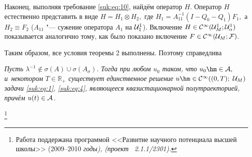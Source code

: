 \smallskip

Наконец,  выполняя  требование   \eqref{suk:eq:10},  найдём оператор $H.$ 
Оператор $H$ естественно представить в виде $H = H_1 \otimes H_2,$ где $H_1 =A^{-1}_{11}(I-Q_0-Q_1)F_1,$ а 
$H_2 \equiv F_2$ ($A_{11}$  "---  сужение оператора $A_1$ на ${\cal U}^1_1$). 
Включение \mbox{$H \in {\cal C}^{\infty}({\cal U}_M^1;{\cal U}_{\alpha}^1) $} показывается аналогично тому, как было показано включение $F \in {\cal C}^{\infty}({\cal U}_M;{\cal F})$.

Таким образом, все условия теоремы 2 выполнены. Поэтому справедлива
\begin{theorem}[8]{\it Пусть  ${\lambda}^{-1} \not\in \sigma (A) \cup \sigma (A_{\sigma})$. Тогда при  любом $u_0$ таком, что $u_0\hm\in {\cal A},$ и~некотором  $T \in {\mathbb R}_{+}$ существует  единственное решение \mbox{$u \hm \in {\cal C}^{\infty} ( (0,T);$} ${\cal U}_M  )$ задачи
\eqref{suk:eq:1},  \eqref{suk:eq:4}, являющееся квазистационарной полутраекторией, причём $u(t) \in {\cal A}$.}
\end{theorem}



\thanks{Работа  поддержана программой  <<Развитие научного потенциала высшей школы>> \rm (2009--2010 \it годы\rm),
(\it проект \rm \No~2.1.1/2301).}

\pagebreak

